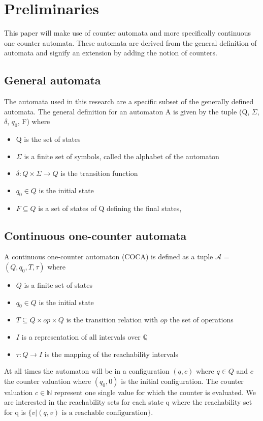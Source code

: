 \documentclass[12pt]{article}
\begin{document}
\section{Preliminaries}
This paper will make use of counter automata and more specifically continuous one counter automata. These automata are derived from the general definition of automata and signify an extension by adding the notion of counters.

\subsection{General automata}
The automata used in this research are a specific subset of the generally defined automata. The general definition for an automaton A is given by the tuple (Q, $\Sigma$, $\delta$, $q_0$, F) where
\begin{itemize}
	\item Q is the set of states
	\item $\Sigma$ is a finite set of symbols, called the alphabet of the automaton
	\item $\delta: Q \times \Sigma \rightarrow Q$ is the transition function
	\item $q_0 \in Q$ is the initial state
	\item $F \subseteq Q$ is a set of states of Q defining the final states, 
\end{itemize}

\subsection{Continuous one-counter automata}
A continuous one-counter automaton (COCA) is defined as a tuple $\mathcal{A}$ = $(Q, q_0, T, \tau)$ where
\begin{itemize}
	\item $Q$ is a finite set of states
	\item $q_0 \in Q$ is the initial state
	\item $T \subseteq Q \times op \times Q$ is the transition relation with $op$ the set of operations
	\item $I$ is a representation of all intervals over $\mathbb{Q}$
	\item $\tau: Q \rightarrow I$ is the mapping of the reachability intervals
\end{itemize}

At all times the automaton will be in a configuration $(q, c)$ where $q \in Q$ and $c$ the counter valuation where $(q_0, 0)$ is the initial configuration. The counter valuation $c \in \mathbb{N}$ represent one single value for which the counter is evaluated. We are interested in the reachability sets for each state q where the reachability set for q is $\{v | (q, v) \text{ is a reachable configuration}\}$.
\end{document}
